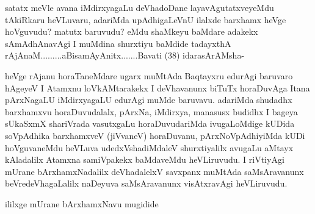 \begin{artha}
satatx meVle avana iMdirxyagaLu deVhadoDane layavAgutatxveyeMdu tAkiRkaru heVLuvaru, adariMda upAdhigaLeVnU ilalxde barxhamx heVge hoVguvudu? matutx baruvudu? eMdu shaMkeyu baMdare adakekx sAmAdhAnavAgi I muMdina shurxtiyu baMdide tadayxthA rAjAnaM.........aBisamAyAnitx.......Bavati (38) idara\break sArAMsha-
\end{artha}

\begin{artha}
heVge rAjanu horaTaneMdare ugarx muMtAda Baqtayxru edurAgi baruvaro hAgeyeV I Atamxnu loVkAMtarakekx I deVhavanunx biTuTx horaDuvAga Itana pArxNagaLU iMdirxyagaLU edurAgi muMde baruvavu. adariMda shudadhx barxhamxvu horaDuvudalalx, pArxNa, iMdirxya, manasusx budidhx I bageya sUkaSxmX shariVrada vasutxgaLu horaDuvudariMda ivugaLoMdige kUDida soVpAdhika barxhamxveV (jiVvaneV) horaDuvanu, pArxNoVpAdhiyiMda kUDi hoVguvaneMdu heVLuva udedxVshadiMdaleV shurxtiyalilx avugaLu aMtayx kAladalilx Atamxna samiVpakekx baMdaveMdu heVLiruvudu. I riVtiyAgi mUrane bArxhamxNadalilx deVhadalelxV savxpanx muMtAda saMsAravanunx beVredeVhagaLalilx naDeyuva saMsAravanunx visAtxravAgi heVLiruvudu.
\end{artha}

\begin{center}
ililxge mUrane bArxhamxNavu mugidide
\end{center}

